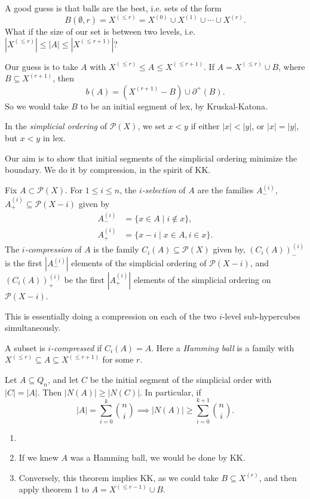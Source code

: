 \documentclass[12pt]{article}
\begin{document}
A good guess is that balls are the best, i.e. sets of the form
\[
B(\emptyset, r) = X^{(\leq r)} = X^{(0)} \cup X^{(1)} \cup \cdots \cup X^{(r)}.
\]
What if the size of our set is between two levels, i.e. $|X^{(\leq r)}| \leq |A| \leq |X^{(\leq r + 1)}|$?

Our guess is to take $A$ with $X^{(\leq r)} \leq A \leq X^{(\leq r + 1)}$. If $A = X^{(\leq r)} \cup B$, where $B \subseteq X^{(r + 1)}$, then
\[
b(A) = (X^{(r+1)} - B) \cup \partial^{+}(B).
\]
So we would take $B$ to be an initial segment of lex, by Kruskal-Katona.

In the \emph{simplicial ordering} of $\mathcal{P}(X)$, we set $x < y$ if either $|x| < |y|$, or $|x| = |y|$, but $x < y$ in lex.

Our aim is to show that initial segments of the simplicial ordering minimize the boundary. We do it by compression, in the spirit of KK.

Fix $A \subset \mathcal{P}(X)$. For $1 \leq i \leq n$, the \emph{$i$-selection} of $A$ are the families $A_-^{(i)}$, $A_+^{(i)} \subseteq \mathcal{P}(X - i)$ given by
\begin{align*}
	A_{-}^{(i)} &= \{x \in A \mid i \not \in x\}, \\
	A_{+}^{(i)} &= \{x-i \mid x \in A, i \in x\}.
\end{align*}
The \emph{$i$-compression} of $A$ is the family $C_i(A) \subseteq \mathcal{P}(X)$ given by, $(C_i(A))^{(i)}_{-}$ is the first $|A_{-}^{(i)}|$ elements of the simplicial ordering of $\mathcal{P}(X - i)$, and $(C_i(A))_{+}^{(i)}$ be the first $|A_{+}^{(i)}|$ elements of the simplicial ordering on $\mathcal{P}(X - i)$.

This is essentially doing a compression on each of the two $i$-level sub-hypercubes simultaneously.

A subset is \emph{$i$-compressed} if $C_i(A) = A$. Here a \emph{Hamming ball} is a family with $X^{(\leq r)} \subseteq A \subseteq X^{(\leq r + 1)}$ for some $r$.

\begin{theorem}
	Let $A \subseteq Q_n$, and let $C$ be the initial segment of the simplicial order with $|C| = |A|$. Then $|N(A)| \geq |N(C)|$. In particular, if
	\[
	|A| = \sum_{i = 0}^{k} \binom ni \implies |N(A)| \geq \sum_{i = 0}^{k + 1} \binom ni.
	\]
\end{theorem}

\begin{remark}
	\begin{enumerate}
		\item[]
		\item If we knew $A$ was a Hamming ball, we would be done by KK.
		\item Conversely, this theorem implies KK, as we could take $B \subseteq X^{(r)}$, and then apply theorem 1 to $A = X^{(\leq r - 1)} \cup B$.
	\end{enumerate}
\end{remark}
\end{document}
